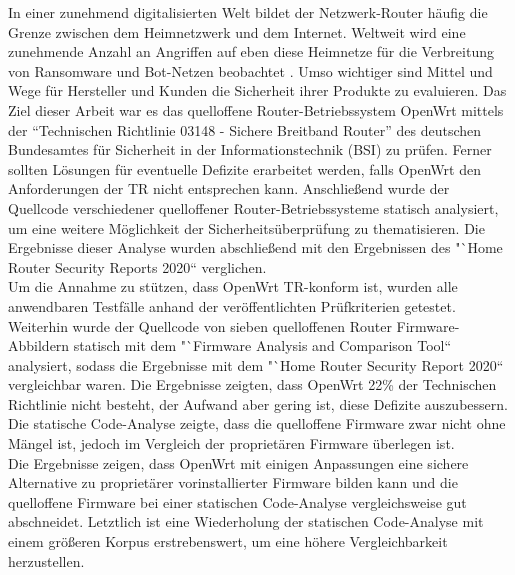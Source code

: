 \documentclass[a4paper]{book}
\begin{document}
\begin{large}
\begin{onehalfspace}
In einer zunehmend digitalisierten Welt bildet der Netzwerk-Router häufig die Grenze zwischen dem Heimnetzwerk und dem Internet. Weltweit wird eine zunehmende Anzahl an Angriffen auf eben diese Heimnetze für die Verbreitung von Ransomware und Bot-Netzen beobachtet \cite[p.~11-15]{BundesamtfurSicherheitinderInformationstechnik.2020}. Umso wichtiger sind Mittel und Wege für Hersteller und Kunden die Sicherheit ihrer Produkte zu evaluieren. Das Ziel dieser Arbeit war es das quelloffene Router-Betriebssystem OpenWrt mittels der "`Technischen Richtlinie 03148 - Sichere Breitband Router"' des deutschen Bundesamtes für Sicherheit in der Informationstechnik (BSI) zu prüfen. Ferner sollten Lösungen für eventuelle Defizite erarbeitet werden, falls OpenWrt den Anforderungen der TR nicht entsprechen kann. Anschließend wurde der Quellcode verschiedener quelloffener Router-Betriebssysteme statisch analysiert, um eine weitere Möglichkeit der Sicherheitsüberprüfung zu thematisieren. Die Ergebnisse dieser Analyse wurden abschließend mit den Ergebnissen des "`Home Router Security Reports 2020“ verglichen. \\
\indent Um die Annahme zu stützen, dass OpenWrt TR-konform ist, wurden alle anwendbaren Testfälle anhand der veröffentlichten Prüfkriterien getestet. Weiterhin wurde der Quellcode von sieben quelloffenen Router Firmware-Abbildern statisch mit dem "`Firmware Analysis and Comparison Tool“ analysiert, sodass die Ergebnisse mit dem "`Home Router \mbox Security Report 2020“ vergleichbar waren. Die Ergebnisse zeigten, dass OpenWrt 22\% der Technischen Richtlinie nicht besteht, der Aufwand aber gering ist, diese Defizite auszubessern. Die statische Code-Analyse zeigte, dass die quelloffene Firmware zwar nicht ohne Mängel ist, jedoch im Vergleich der proprietären Firmware überlegen ist. \\
\indent Die Ergebnisse zeigen, dass OpenWrt mit einigen Anpassungen eine sichere Alternative zu proprietärer vorinstallierter Firmware bilden kann und die quelloffene Firmware bei einer statischen Code-Analyse vergleichsweise gut abschneidet. Letztlich ist eine Wiederholung der statischen Code-Analyse mit einem größeren Korpus erstrebenswert, um eine höhere Vergleichbarkeit herzustellen. 

\end{onehalfspace}
  
  
\clearpage


\end{large}
\end{document}
